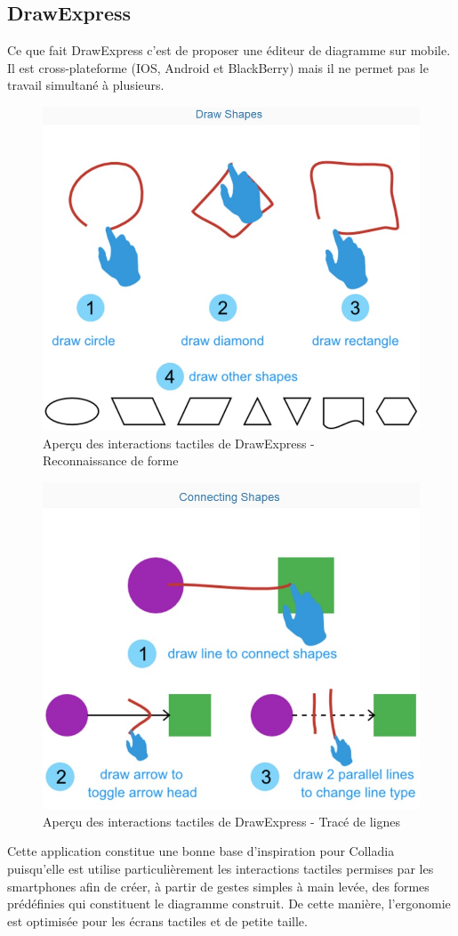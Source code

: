 \documentclass[a4paper,11pt]{article}
\begin{document}
\subsection{DrawExpress}
Ce que fait DrawExpress c'est de proposer une éditeur de diagramme sur mobile. Il est cross-plateforme (IOS, Android et BlackBerry) mais il ne permet pas le travail simultané à plusieurs.

\begin{figure}[!h]
	\centering
	\includegraphics[width=.6\textwidth]{img/DrawExpressRecognition}
	\caption{Aperçu des interactions tactiles de DrawExpress - \\Reconnaissance de forme}
\end{figure}

\begin{figure}[!h]
	\centering
	\includegraphics[width=.6\textwidth]{img/DrawExpressLinks}
	\caption{Aperçu des interactions tactiles de DrawExpress - Tracé de lignes}
\end{figure}

Cette application constitue une bonne base d'inspiration pour Colladia puisqu'elle est utilise particulièrement les interactions tactiles permises par les smartphones afin de créer, à partir de gestes simples à main levée, des formes prédéfinies qui constituent le diagramme construit. De cette manière, l'ergonomie est optimisée pour les écrans tactiles et de petite taille.
\end{document}
